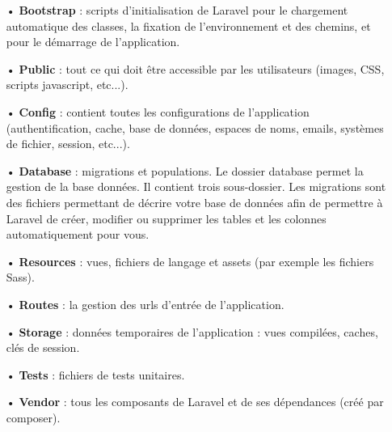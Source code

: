 \documentclass[12pt,a4paper]{article}
\begin{document}
\begin{itemize}

\item[•] \textbf{Bootstrap} : scripts d'initialisation de Laravel pour le chargement automatique des classes, la fixation de l'environnement et des chemins, et pour le démarrage de l'application.\\

\item[•] \textbf{Public} : tout ce qui doit être accessible par les utilisateurs (images, CSS, scripts javascript, etc...).\\

\item[•] \textbf{Config} : contient toutes les configurations de l'application (authentification, cache, base de données, espaces de noms, emails, systèmes de fichier, session, etc...).\\

\item[•] \textbf{Database} : migrations et populations. Le dossier database permet la gestion de la base données. Il contient trois sous-dossier.
Les migrations sont des fichiers permettant de décrire votre base de données afin de permettre
à Laravel de créer, modifier ou supprimer les tables et les colonnes automatiquement pour vous.\\

\item[•] \textbf{Resources} : vues, fichiers de langage et assets (par exemple les fichiers Sass).\\

\item[•] \textbf{Routes} : la gestion des urls d'entrée de l'application.\\

\item[•] \textbf{Storage} : données temporaires de l'application : vues compilées, caches, clés de session.\\

\item[•] \textbf{Tests} : fichiers de tests unitaires.\\

\item[•] \textbf{Vendor} : tous les composants de Laravel et de ses dépendances (créé par composer).\\

\end{itemize}
\end{document}
